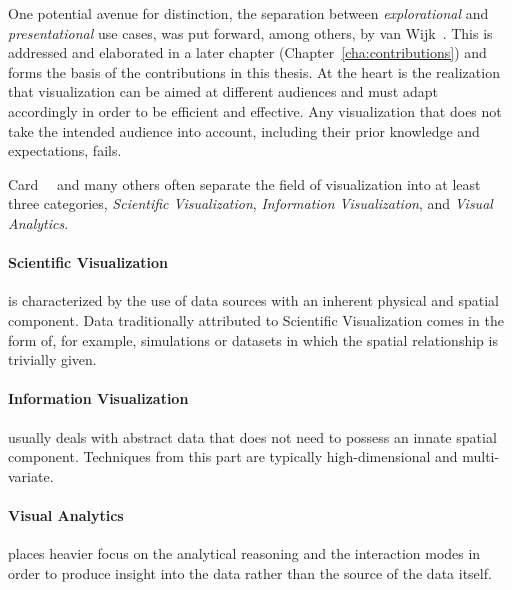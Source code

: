 One potential avenue for distinction, the separation between \emph{explorational} and \emph{presentational} use cases, was put forward, among others, by van Wijk~\cite{van2005value}.  This is addressed and elaborated in a later chapter (Chapter~\ref{cha:contributions}) and forms the basis of the contributions in this thesis.  At the heart is the realization that visualization can be aimed at different audiences and must adapt accordingly in order to be efficient and effective.  Any visualization that does not take the intended audience into account, including their prior knowledge and expectations, fails.

Card~\etal~\cite{card1999readings} and many others often separate the field of visualization into at least three categories, \emph{Scientific Visualization}, \emph{Information Visualization}, and \emph{Visual Analytics}.  

\paragraph{Scientific Visualization} is characterized by the use of data sources with an inherent physical and spatial component.  Data traditionally attributed to Scientific Visualization comes in the form of, for example, simulations or datasets in which the spatial relationship is trivially given.

\paragraph{Information Visualization} usually deals with abstract data that does not need to possess an innate spatial component.  Techniques from this part are typically high-dimensional and multi-variate.

\paragraph{Visual Analytics} places heavier focus on the analytical reasoning and the interaction modes in order to produce insight into the data rather than the source of the data itself.

